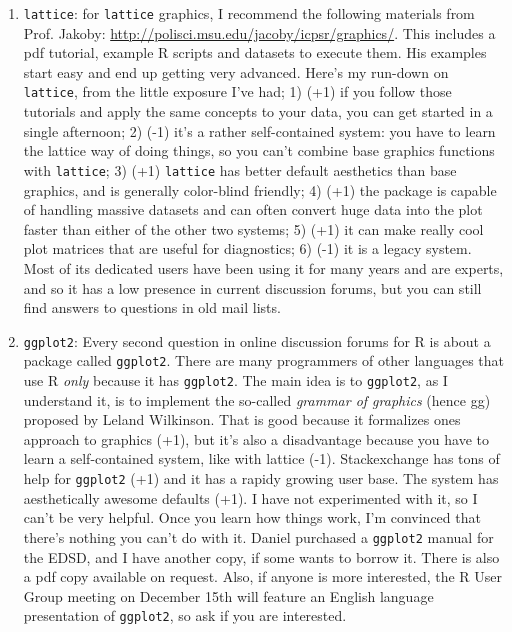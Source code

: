 \documentclass[a4paper]{article}
\begin{document}
\begin{enumerate}
\item{\texttt{lattice}}: for \texttt{lattice} graphics, I recommend the following materials from Prof. Jakoby: \url{http://polisci.msu.edu/jacoby/icpsr/graphics/}. This includes a pdf tutorial, example R scripts and datasets to execute them. His examples start easy and end up getting very advanced. Here's my run-down on \texttt{lattice}, from the little exposure I've had; 1) (+1) if you follow those tutorials and apply the same concepts to your data, you can get started in a single afternoon; 2) (-1) it's a rather self-contained system: you have to learn the lattice way of doing things, so you can't combine base graphics functions with \texttt{lattice}; 3) (+1) \texttt{lattice} has better default aesthetics than base graphics, and is generally color-blind friendly; 4) (+1) the package is capable of handling massive datasets and can often convert huge data into the plot faster than either of the other two systems; 5) (+1) it can make really cool plot matrices that are useful for diagnostics; 6) (-1) it is a legacy system. Most of its dedicated users have been using it for many years and are experts, and so it has a low presence in current discussion forums, but you can still find answers to questions in old mail lists.

\item{\texttt{ggplot2}}: Every second question in online discussion forums for R is about a package called \texttt{ggplot2}. There are many programmers of other languages that use R \textit{only} because it has \texttt{ggplot2}. The main idea is to \texttt{ggplot2}, as I understand it, is to implement the so-called \textit{grammar of graphics} (hence gg) proposed by Leland Wilkinson. That is good because it formalizes ones approach to graphics (+1), but it's also a disadvantage because you have to learn a self-contained system, like with lattice (-1). Stackexchange has tons of help for \texttt{ggplot2} (+1) and it has a rapidy growing user base. The system has aesthetically awesome defaults (+1). I have not experimented with it, so I can't be very helpful. Once you learn how things work, I'm convinced that there's nothing you can't do with it. Daniel purchased a \texttt{ggplot2} manual for the EDSD, and I have another copy, if some wants to borrow it. There is also a pdf copy available on request. Also, if anyone is more interested, the R User Group meeting on December 15th will feature an English language presentation of \texttt{ggplot2}, so ask if you are interested.


\end{enumerate}
\end{document}
